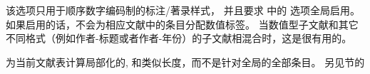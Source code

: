 \begin{optionlist*}
该选项只用于顺序数字编码制的标注/著录样式，
并且要求  中的  选项全局启用。
如果启用的话，\biblatex 不会为相应文献中的条目分配数值标签。
当数值型子文献和其它不同格式（例如作者-标题或者作者-年份）的子文献相混合时，这是很有用的。



为当前文献表计算局部化的, 和类似长度，而不是针对全局的全部条目。
另见节的


\end{optionlist*}

